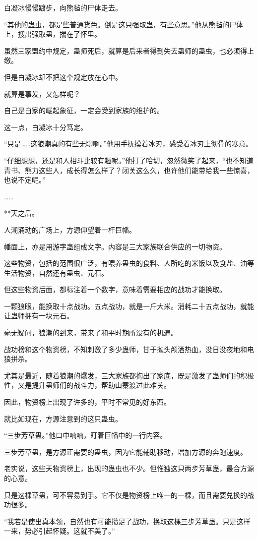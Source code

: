 \begin{this_body}
白凝冰慢慢踱步，向熊毡的尸体走去。

“其他的蛊虫，都是些普通货色。倒是这只强取蛊，有些意思。”他从熊毡的尸体上，搜出强取蛊，揣在了怀里。

虽然三家盟约中规定，蛊师死后，就算是后来者得到失去蛊师的蛊虫，也必须得上缴。

但是白凝冰却不把这个规定放在心中。

就算是事发，又怎样呢？

自己是白家的崛起象征，一定会受到家族的维护的。

这一点，白凝冰十分笃定。

“只是……这狼潮真的有些无聊啊。”他用手抚摸着冰刃，感受着冰刃上彻骨的寒意。

“仔细想想，还是和人相斗比较有趣呢。”他打了哈切，忽然微笑了起来，“也不知道青书、熊力这些人，成长得怎么样了？闭关这么久，也许他们能带给我一些惊喜，也说不定呢。”

……

**天之后。

人潮涌动的广场上，方源仰望着一杆巨幡。

幡面上，亦是用游字蛊组成文字。内容是三大家族联合供应的一切物资。

这些物资，包括的范围很广泛，有喂养蛊虫的食料、人所吃的米饭以及食盐、油等生活物资，自然还有蛊虫、元石。

但这些物资后面，都标注着一个数字，意味着需要相应的战功才能换取。

一颗狼眼，能换取十点战功。五点战功，就是一斤大米。消耗二十五点战功，就能让蛊师拥有一块元石。

毫无疑问，狼潮的到来，带来了和平时期所没有的机遇。

战功榜和这个物资榜，不知刺激了多少蛊师，甘于抛头颅洒热血，没日没夜地和电狼拼杀。

尤其是最近，随着狼潮的爆发，三大家族都掏出了家底，既是激发了蛊师们的积极性，又是提升蛊师们的战斗力，帮助山寨渡过此难关。

因此，物资榜上出现了许多的，平时不常见的好东西。

就比如现在，方源注意到的这只蛊虫。

“三步芳草蛊。”他口中喃喃，盯着巨幡中的一行内容。

三步芳草蛊，是方源正需要的蛊虫，因为它能辅助移动，增加方源的奔跑速度。

老实说，这些天物资榜上，出现的蛊虫也不少。但惟独这只两步芳草蛊，最合方源的心意。

只是这棵草蛊，可不容易到手。它不仅是物资榜上唯一的一棵，而且需要兑换的战功很多。

“我若是使出真本领，自然也有可能攒足了战功，换取这棵三步芳草蛊。只是这样一来，势必引起怀疑。这就不美了。”


\end{this_body}
